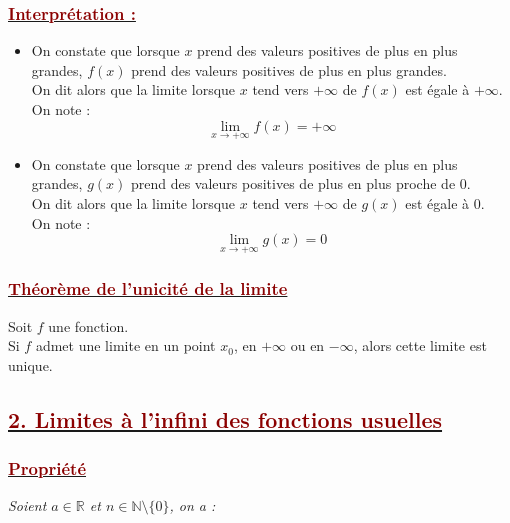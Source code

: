 \documentclass[12pt,a4paper]{article}
\begin{document}
\subsubsection*{\underline{\textcolor{darkred}{ Interprétation :}}}

\begin{itemize}
\item On constate que lorsque $x$ prend des valeurs positives de plus en plus grandes, $f(x)$ prend des valeurs positives de plus en plus grandes. \\
On dit alors que la limite lorsque $x$ tend vers $+\infty$ de $f(x)$ est égale à $+\infty$. \\
On note :
\[
\boxed{\lim_{x \to +\infty} f(x) = +\infty}
\]

\item On constate que lorsque $x$ prend des valeurs positives de plus en plus grandes, $g(x)$ prend des valeurs positives de plus en plus proche de $0$. \\
On dit alors que la limite lorsque $x$ tend vers $+\infty$ de $g(x)$ est égale à $0$. \\
On note :
\[
\boxed{\lim_{x \to +\infty} g(x) = 0}
\]
\end{itemize}

\subsubsection*{\underline{\textcolor{darkred}{ Théorème de l’unicité de la limite }}}
Soit $f$ une fonction.\\
Si $f$ admet une limite en un point $x_0$, en $+\infty$ ou en $-\infty$, alors cette limite est unique.

\subsection*{\underline{\textcolor{darkred}{ 2. Limites à l’infini des fonctions usuelles}}}
\subsubsection*{\underline{\textcolor{darkred}{ Propriété }}}

\noindent \textit{Soient $a \in \mathbb{R}$ et $n \in \mathbb{N} \setminus \{0\}$, on a :}

\vspace{0.4cm}
\end{document}
